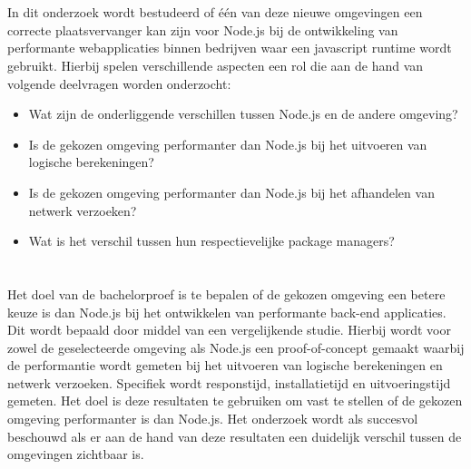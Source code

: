 \section{}%
\label{sec:onderzoeksvraag}

In dit onderzoek wordt bestudeerd of één van deze nieuwe omgevingen
een correcte plaatsvervanger kan zijn voor Node.js bij de ontwikkeling van performante webapplicaties binnen bedrijven 
waar een javascript runtime wordt gebruikt.
Hierbij spelen verschillende aspecten een rol die aan de hand van volgende deelvragen worden onderzocht:
\begin{itemize}
  \item Wat zijn de onderliggende verschillen tussen Node.js en de andere omgeving?
  \item Is de gekozen omgeving performanter dan Node.js bij het uitvoeren van logische berekeningen?
  \item Is de gekozen omgeving performanter dan Node.js bij het afhandelen van netwerk verzoeken?
  \item Wat is het verschil tussen hun respectievelijke package managers?
\end{itemize}

\section{}%
\label{sec:onderzoeksdoelstelling}


Het doel van de bachelorproef is te bepalen of de gekozen omgeving een betere keuze is dan Node.js bij het
ontwikkelen van performante back-end applicaties. Dit wordt bepaald door middel van een vergelijkende studie.
Hierbij wordt voor zowel de geselecteerde omgeving als Node.js een proof-of-concept gemaakt waarbij de performantie wordt gemeten bij het uitvoeren van logische berekeningen 
en netwerk verzoeken. Specifiek wordt responstijd, installatietijd en uitvoeringstijd gemeten. 
Het doel is deze resultaten te gebruiken om vast te stellen of de gekozen omgeving performanter is dan Node.js. 
Het onderzoek wordt als succesvol beschouwd als er aan de hand van deze resultaten een duidelijk verschil tussen de omgevingen zichtbaar is.
\section{}%
\label{sec:opzet-bachelorproef}

